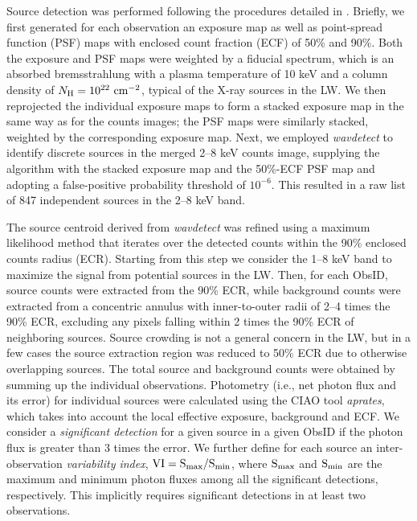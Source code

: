 \documentclass[fleqn,usenatbib]{mnras}
\begin{document}
Source detection was performed following the procedures detailed in \citet{2018ApJS..235...26Z}.
Briefly, we first generated for each observation an exposure map as well as point-spread function (PSF) maps with enclosed count fraction (ECF) of 50\% and 90\%. 
Both the exposure and PSF maps were weighted by a fiducial spectrum, which is an absorbed bremsstrahlung with a plasma temperature of 10 keV and a column density of $N_{\rm H}=10^{22}{\rm~cm^{-2}}$, typical of the X-ray sources in the LW. 
We then reprojected the individual exposure maps to form a stacked exposure map in the same way as for the counts images; the PSF maps were similarly stacked, weighted by the corresponding exposure map. 
Next, we employed {\it wavdetect} to identify discrete sources in the merged 2--8 keV counts image, supplying the algorithm with the stacked exposure map and the 50\%-ECF PSF map and adopting a false-positive probability threshold of $10^{-6}$. 
This resulted in a raw list of 847 independent sources in the 2--8 keV band. 

The source centroid derived from {\it wavdetect} was refined using a maximum likelihood method that iterates over the detected counts within the 90\% enclosed counts radius (ECR).
Starting from this step we consider the 1--8 keV band to maximize the signal from potential sources in the LW. 
Then, for each ObsID, source counts were extracted from the 90\% ECR, while background counts were extracted from a concentric annulus with inner-to-outer radii of 2--4 times the 90\% ECR, excluding any pixels falling within 2 times the 90\% ECR of neighboring sources.
Source crowding is not a general concern in the LW, but in a few cases the source extraction region was reduced to 50\% ECR due to otherwise overlapping sources. 
The total source and background counts were obtained by summing up the individual observations. 
Photometry (i.e., net photon flux and its error) for individual sources were calculated using the CIAO tool \emph{aprates}, which takes into account the local effective exposure, background and ECF. 
We consider a {\it significant detection} for a given source in a given ObsID if the photon flux is greater than 3 times the error. 
We further define for each source an inter-observation {\it variability index}, $\rm VI=S_{max}/S_{min}$, where $\rm S_{max}$ and $\rm S_{min}$ are the maximum and minimum photon fluxes among all the significant detections, respectively. This implicitly requires significant detections in at least two observations.
\end{document}

